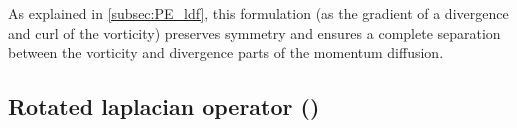 \documentclass[../tex_main/NEMO_manual]{subfiles}
\begin{document}
As explained in \autoref{subsec:PE_ldf},
this formulation (as the gradient of a divergence and curl of the vorticity) preserves symmetry and
ensures a complete separation between the vorticity and divergence parts of the momentum diffusion. 

\subsection[Rotated laplacian (\protect\np{ln\_dynldf\_iso}\forcode{ = .true.})]
				{Rotated laplacian operator (\protect{})}
\label{subsec:DYN_ldf_iso}
\end{document}
